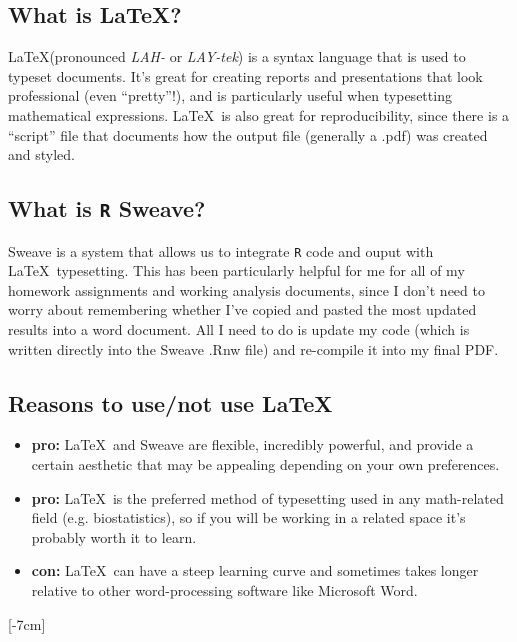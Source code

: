 \documentclass[11pt]{article}\usepackage[]{graphicx}\usepackage[]{color}
\begin{document}
\subsection{What is \LaTeX?}

\LaTeX (pronounced \textit{LAH-} or \textit{LAY-tek}) is a syntax language that is used to typeset documents. It's great for creating reports and presentations that look professional (even ``pretty''!), and is particularly useful when typesetting mathematical expressions. \LaTeX\ is also great for reproducibility, since there is a ``script'' file that documents how the output file (generally a .pdf) was created and styled. 

\subsection{What is \texttt{R} Sweave?}

Sweave is a system that allows us to integrate \texttt{R} code and ouput with \LaTeX\ typesetting. This has been particularly helpful for me for all of my homework assignments and working analysis documents, since I don't need to worry about remembering whether I've copied and pasted the most updated results into a word document. All I need to do is update my code (which is written directly into the Sweave .Rnw file) and re-compile it into my final PDF. 

\subsection{Reasons to use/not use \LaTeX\ }

\begin{itemize}
  \item \textbf{pro: }\LaTeX\ and Sweave are flexible, incredibly powerful, and provide a certain aesthetic that may be appealing depending on your own preferences. 
  \item \textbf{pro: }\LaTeX\ is the preferred method of typesetting used in any math-related field (e.g. biostatistics), so if you will be working in a related space it's probably worth it to learn.
  \item \textbf{con: }\LaTeX\ can have a steep learning curve and sometimes takes longer relative to other word-processing software like Microsoft Word. 
\end{itemize}

[-7cm]
\end{document}
